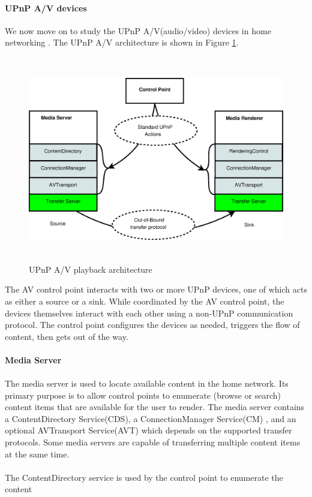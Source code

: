 \paragraph{UPnP A/V devices\label{2_2_1_2}}
We now move on to study the UPnP A/V(audio/video) devices in home networking
\label{upnpav}. The UPnP A/V architecture is shown in Figure
\ref{upnp_playback}.
\begin{figure}[hb] 
\centering \includegraphics[height=9cm]{charts/upnp_playback} 
\caption{UPnP A/V playback architecture \label{upnp_playback}} 
\end{figure}
The AV control point interacts with two or more UPnP
devices, one of which acts as either a source or a sink. While coordinated by
the AV control point, the devices themselves interact with each other using a
non-UPnP communication protocol. The control point configures the devices as
needed, triggers the flow of content, then gets out of the way.\\
\\
\textbf{Media Server} \\ 
\\
The media server is used to locate available content in the home network. Its 
primary purpose is to allow control points to enumerate (browse or search) 
content items that are available for the user to render. The media server 
contains a ContentDirectory Service(CDS), a ConnectionManager Service(CM) 
, and an optional AVTransport Service(AVT) which depends on the supported 
transfer protocols. Some media servers are capable of transferring multiple 
content items at the same time. \\
\\
The ContentDirectory service is used by the control point to enumerate the content 
